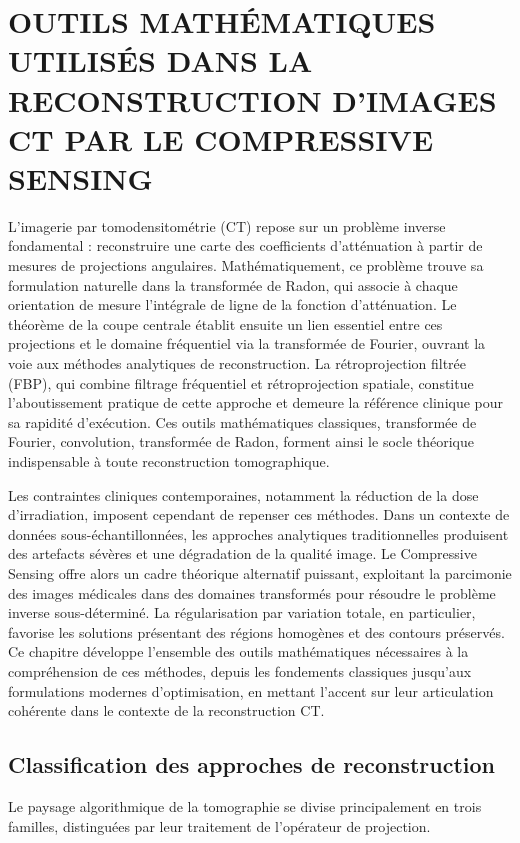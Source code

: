 \chapter{OUTILS MATHÉMATIQUES UTILISÉS DANS LA RECONSTRUCTION D'IMAGES CT PAR LE COMPRESSIVE SENSING}
\label{chapitre2} 
L'imagerie par tomodensitométrie (CT) repose sur un problème inverse fondamental : reconstruire une carte des coefficients d'atténuation à partir de mesures de projections angulaires. Mathématiquement, ce problème trouve sa formulation naturelle dans la transformée de Radon, qui associe à chaque orientation de mesure l'intégrale de ligne de la fonction d'atténuation. Le théorème de la coupe centrale établit ensuite un lien essentiel entre ces projections et le domaine fréquentiel via la transformée de Fourier, ouvrant la voie aux méthodes analytiques de reconstruction. La rétroprojection filtrée (FBP), qui combine filtrage fréquentiel et rétroprojection spatiale, constitue l'aboutissement pratique de cette approche et demeure la référence clinique pour sa rapidité d'exécution. Ces outils mathématiques classiques, transformée de Fourier, convolution, transformée de Radon, forment ainsi le socle théorique indispensable à toute reconstruction tomographique.

Les contraintes cliniques contemporaines, notamment la réduction de la dose d'irradiation, imposent cependant de repenser ces méthodes. Dans un contexte de données sous-échantillonnées, les approches analytiques traditionnelles produisent des artefacts sévères et une dégradation de la qualité image. Le Compressive Sensing offre alors un cadre théorique alternatif puissant, exploitant la parcimonie des images médicales dans des domaines transformés pour résoudre le problème inverse sous-déterminé. La régularisation par variation totale, en particulier, favorise les solutions présentant des régions homogènes et des contours préservés. Ce chapitre développe l'ensemble des outils mathématiques nécessaires à la compréhension de ces méthodes, depuis les fondements classiques jusqu'aux formulations modernes d'optimisation, en mettant l'accent sur leur articulation cohérente dans le contexte de la reconstruction CT.

\section{Classification des approches de reconstruction}
Le paysage algorithmique de la tomographie se divise principalement en trois familles, distinguées par leur traitement de l'opérateur de projection.

